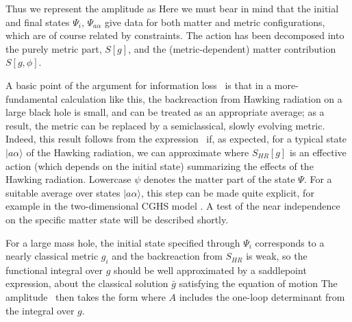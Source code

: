 Thus we represent the amplitude as
%
\eqn{}
%
Here we must bear in mind that the  initial and final states $\Psi_i$, $\Psi_{a\alpha}$ give data for both matter and metric configurations,
which are of course related by constraints.  The action has been decomposed into the purely metric part, $S[g]$, and the (metric-dependent) matter contribution $S[g,\phi]$.

A basic point of the argument for information loss \Hawkunc\ is that in a more-fundamental calculation like this, the backreaction from Hawking radiation on a large black hole is small, and can be treated as an appropriate average; as a result, the metric can be replaced by a semiclassical, slowly evolving metric.  Indeed, this result follows from the expression \fctlint\ if, as expected, for a typical state $|a\alpha\rangle$ of the Hawking radiation, we can approximate
%
\eqn{}
%
where $S_{HR}[g]$ is an effective action (which depends on the initial state) summarizing the effects of the Hawking radiation.  Lowercase $\psi$ denotes the matter part of the state $\Psi$.  For a suitable average over states $|a\alpha\rangle$, this step can be made quite explicit, for example in the two-dimensional CGHS model .  A test of the near independence on the specific matter state will be described shortly.

For a large mass hole, the initial state specified through $\Psi_i$ corresponds to a nearly classical metric $g_i$
 and the backreaction from $S_{HR}$ is weak, so the functional integral over $g$ should be well approximated by a saddlepoint expression, about the classical solution $\bar g$ satisfying the equation of motion
%
\eqn{}
%
The amplitude \fctlint\ then takes the form
%
\eqn{}
%
where $A$ includes the one-loop determinant from the integral over $g$.




